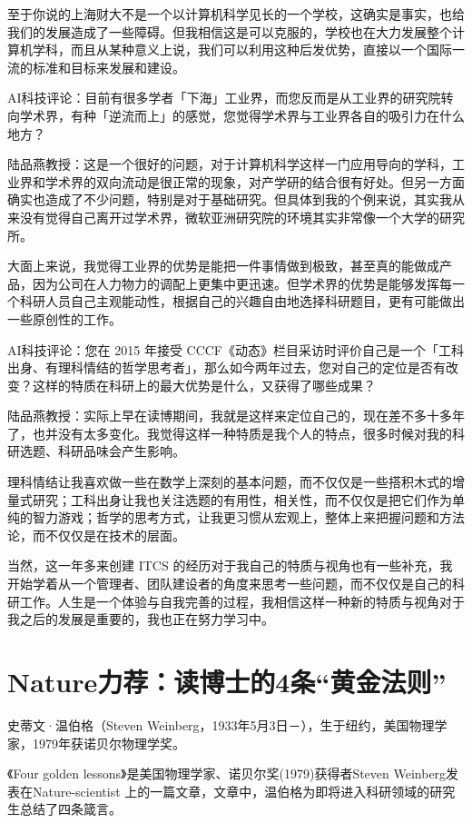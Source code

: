 至于你说的上海财大不是一个以计算机科学见长的一个学校，这确实是事实，也给我们的发展造成了一些障碍。但我相信这是可以克服的，学校也在大力发展整个计算机学科，而且从某种意义上说，我们可以利用这种后发优势，直接以一个国际一流的标准和目标来发展和建设。

AI科技评论：目前有很多学者「下海」工业界，而您反而是从工业界的研究院转向学术界，有种「逆流而上」的感觉，您觉得学术界与工业界各自的吸引力在什么地方？

陆品燕教授：这是一个很好的问题，对于计算机科学这样一门应用导向的学科，工业界和学术界的双向流动是很正常的现象，对产学研的结合很有好处。但另一方面确实也造成了不少问题，特别是对于基础研究。但具体到我的个例来说，其实我从来没有觉得自己离开过学术界，微软亚洲研究院的环境其实非常像一个大学的研究所。

大面上来说，我觉得工业界的优势是能把一件事情做到极致，甚至真的能做成产品，因为公司在人力物力的调配上更集中更迅速。但学术界的优势是能够发挥每一个科研人员自己主观能动性，根据自己的兴趣自由地选择科研题目，更有可能做出一些原创性的工作。

AI科技评论：您在 2015 年接受 CCCF《动态》栏目采访时评价自己是一个「工科出身、有理科情结的哲学思考者」，那么如今两年过去，您对自己的定位是否有改变？这样的特质在科研上的最大优势是什么，又获得了哪些成果？

陆品燕教授：实际上早在读博期间，我就是这样来定位自己的，现在差不多十多年了，也并没有太多变化。我觉得这样一种特质是我个人的特点，很多时候对我的科研选题、科研品味会产生影响。

理科情结让我喜欢做一些在数学上深刻的基本问题，而不仅仅是一些搭积木式的增量式研究；工科出身让我也关注选题的有用性，相关性，而不仅仅是把它们作为单纯的智力游戏；哲学的思考方式，让我更习惯从宏观上，整体上来把握问题和方法论，而不仅仅是在技术的层面。

当然，这一年多来创建 ITCS 的经历对于我自己的特质与视角也有一些补充，我开始学着从一个管理者、团队建设者的角度来思考一些问题，而不仅仅是自己的科研工作。人生是一个体验与自我完善的过程，我相信这样一种新的特质与视角对于我之后的发展是重要的，我也正在努力学习中。



\section{Nature力荐：读博士的4条“黄金法则”}

史蒂文·温伯格（Steven Weinberg，1933年5月3日－），生于纽约，美国物理学家，1979年获诺贝尔物理学奖。


《Four golden lessons》是美国物理学家、诺贝尔奖(1979)获得者Steven Weinberg发表在Nature-scientist 上的一篇文章，文章中，温伯格为即将进入科研领域的研究生总结了四条箴言。



